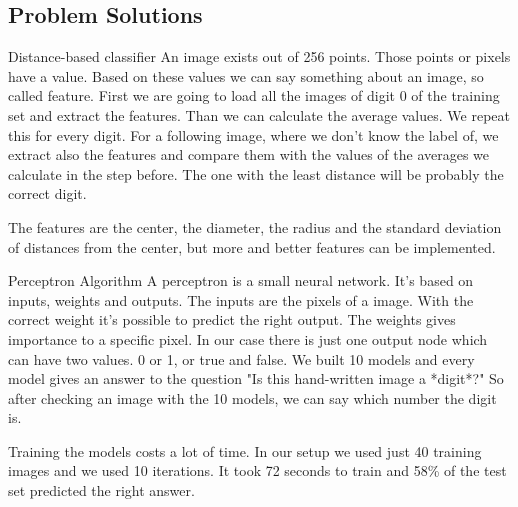 \documentclass{article}
\begin{document}
\subsection{Problem Solutions}
Distance-based classifier
An image exists out of 256 points. Those points or pixels have a value. Based on these values we can say something about an image, so called feature. First we are going to load all the images of digit 0 of the training set and extract the features. Than we can calculate the average values. We repeat this for every digit. For a following image, where we don't know the label of, we extract also the features and compare them with the values of the averages we calculate in the step before. The one with the least distance will be probably the correct digit.

The features are the center, the diameter, the radius and the standard deviation of distances from the center, but more and better features can be implemented. 

Perceptron Algorithm
A perceptron is a small neural network. It's based on inputs, weights and outputs. The inputs are the pixels of a image. With the correct weight it's possible to predict the right output. The weights gives importance to a specific pixel. In our case there is just one output node which can have two values. 0 or 1, or true and false. We built 10 models and every model gives an answer to the question "Is this hand-written image a *digit*?" So after checking an image with the 10 models, we can say which number the digit is. 

Training the models costs a lot of time. In our setup we used just 40 training images and we used 10 iterations. It took 72 seconds to train and 58\% of the test set predicted the right answer. 
\end{document}
